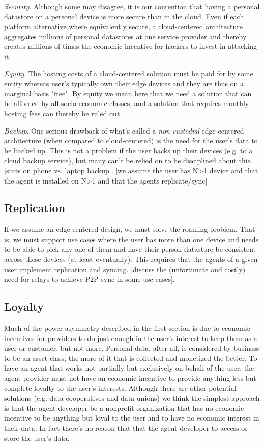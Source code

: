 \documentclass[11pt, oneside]{article}   	%
\begin{document}
\emph{Security}. Although some may disagree, it is our contention that having a personal datastore on a personal device is more secure than in the cloud. Even if each platform alternative where equivalently secure, a cloud-centered architecture aggregates millions of personal datastores at one service provider and thereby creates millions of times the economic incentive for hackers to invest in attacking it. 

\emph{Equity}. The hosting costs of a cloud-centered solution must be paid for by some entity whereas user's typically own their edge devices and they are thus on a marginal basis "free". By equity we mean here that we need a solution that can be afforded by all socio-economic classes, and a solution that requires monthly hosting fees can thereby be ruled out. 

\emph{Backup}. One serious drawback of what's called a \emph{non-custodial} edge-centered architecture (when compared to cloud-centered) is the need for the user's data to be backed up. This is not a problem if the user backs up their devices (e.g. to a cloud backup service), but many can't be relied on to be disciplined about this. [stats on phone vs. laptop backup]. [we assume the user has N>1 device and that the agent is installed on N>1 and that the agents replicate/sync]

\subsection{Replication}

If we assume an edge-centered design, we must solve the roaming problem. That is, we must support use cases where the user has more than one device and needs to be able to pick any one of them and have their person datastore be consistent across these devices (at least eventually). This requires that the agents of a given user implement replication and syncing. [discuss the (unfortunate and costly) need for relays to achieve P2P sync in some use cases].

\subsection{Loyalty}

Much of the power asymmetry described in the first section is due to economic incentives for providers to do just enough in the user's interest to keep them as a user or customer, but not more. Personal data, after all, is considered by business to be an asset class; the more of it that is collected and monetized the better. To have an agent that works not partially but exclusively on behalf of the user, the agent provider must not have an economic incentive to provide anything less but complete loyalty to the user's interests. Although there are other potential solutions (e.g. data cooperatives and data unions) we think the simplest approach is that the agent developer be a nonprofit organization that has no economic incentive to be anything but loyal to the user and to have no economic interest in their data. In fact there's no reason that that the agent developer to access or store the user's data.
\end{document}
